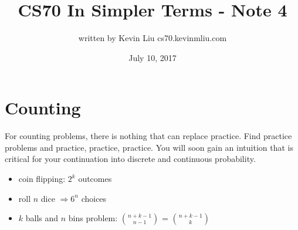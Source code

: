 \documentclass[a4paper]{article}
\title{CS70 In Simpler Terms - Note 4}
\author{written by Kevin Liu cs70.kevinmliu.com}
\date{July 10, 2017}
\begin{document}
\maketitle

\section{Counting}
For counting problems, there is nothing that can replace practice. Find practice problems and practice, practice, practice. You will soon gain an intuition that is critical for your continuation into discrete and continuous probability. 
\begin{itemize}
    \item coin flipping: $2^k$ outcomes
    \item roll $n$ dice $\Rightarrow 6^n$ choices
    \item $k$ balls and $n$ bins problem: $n+k-1 \choose n-1$ = $n+k-1 \choose k$

\end{itemize}
\end{document}
